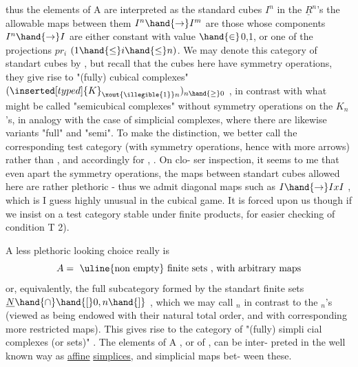 thus the elements of A are interpreted as the standard cubes $I^n$ in the $\underline{R}^{n}$'s
the allowable maps between them $I^n \hand{\to} I^m$ are those whose components $I^n \hand{\to} I$
are either constant with value $\hand{\in}$\hand{\{}0,1\hand{\}}, or one of the projections $pr_i$ \xout{(}
$(1 \hand{\leq} i \hand{\leq} n)$. We may denote this category of standart cubes by \hand{$\square$} , but
recall that  the cubes here have symmetry operations, they give
rise to  "(fully) cubical complexes" $(\inserted[typed]{K}_{\xout{\illegible{1}}n})_{n \hand{\geq} 0}$ , in contrast with what
might be called "semicubical complexes" without symmetry operations on the
$K_n$'s, in analogy with the case of simplicial complexes, where there are
likewise variants "full" and "semi". To make the distinction, we better
call the corresponding test category (with symmetry operations, hence
with more arrows) \hand{$\tilde{\square}$} rather than \hand{$\square$} , and accordingly for \hand{$\tilde{\Delta}$}, \hand{$\Delta$} . On clo-%
ser inspection, it seems to me that even apart the symmetry operations,
the maps between standart cubes allowed here are rather plethoric - thus
we admit diagonal maps such as $I \hand{\to} IxI$ , which is I guess highly unusual
in the cubical game. It is forced upon us though if we insist on a test
category stable under finite products, for easier checking of condition
T 2).

A less plethoric looking choice really is
\[ A = \text{ \uline{non empty} finite sets , with arbitrary maps} \]
or, equivalently, the full subcategory \inserted{$\tilde{\Delta}$} formed by the standart finite sets
$\underline{N}\hand{\cap}\hand{[}0,n\hand{]}$ , which we may call \hand{$\tilde{\Delta}$}$_n$ in contrast to the  \hand{$\Delta$}$_n$'s (viewed as
being endowed with their natural total order, and with corresponding more
restricted maps). This gives rise to the category \hand{$\tilde{\Delta}^{\wedge}$} of "(fully) simpli%
cial complexes (or sets)" . The elements of A , or of \hand{$\tilde{\Delta}$} , can be inter-%
preted in the well known way as \uline{affine} \uline{simplices}, and simplicial maps bet-%
ween these.


